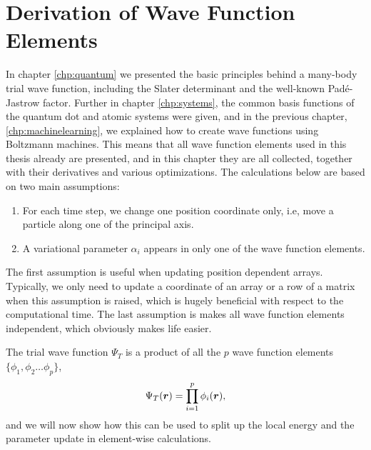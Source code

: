\chapter{Derivation of Wave Function Elements} \label{chp:WFE}
In chapter \eqref{chp:quantum} we presented the basic principles behind a many-body trial wave function, including the Slater determinant and the well-known Padé-Jastrow factor. Further in chapter \eqref{chp:systems}, the common basis functions of the quantum dot and atomic systems were given, and in the previous chapter, \eqref{chp:machinelearning}, we explained how to create wave functions using Boltzmann machines. This means that all wave function elements used in this thesis already are presented, and in this chapter they are all collected, together with their derivatives and various optimizations. The calculations below are based on two main assumptions:
\begin{enumerate}
	\item For each time step, we change one position coordinate only, i.e, move a particle along one of the principal axis.
	\item A variational parameter $\alpha_i$ appears in only one of the wave function elements.
\end{enumerate}
The first assumption is useful when updating position dependent arrays. Typically, we only need to update a coordinate of an array or a row of a matrix when this assumption is raised, which is hugely beneficial with respect to the computational time. The last assumption is makes all wave function elements independent, which obviously makes life easier. 

The trial wave function $\Psi_T$ is a product of all the $p$ wave function elements $\{\phi_1, \phi_2\hdots\phi_p\}$,
\begin{equation}
\Psi_T(\boldsymbol{{r}}) = \prod_{i=1}^p\phi_i(\boldsymbol{{r}}),
\label{eq:elementproduct}
\end{equation}
and we will now show how this can be used to split up the local energy and the parameter update in element-wise calculations.

